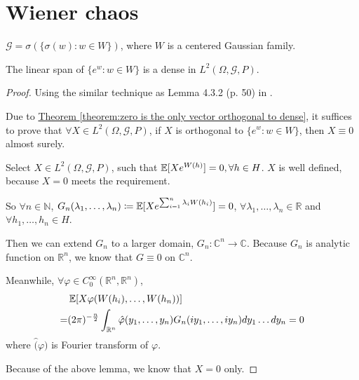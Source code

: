 \chapter{Wiener chaos}

\begin{definition}
$\mathcal{G} = \sigma(\{\sigma(w): w \in W \})$, where $W$ is a centered Gaussian family. 
\end{definition}

\begin{lemma}
\label{lemma:linear span is dense}
The linear span of $\{e^{w}: w \in W\}$ is a dense in $L^2(\Omega, \mathcal{G}, P)$. 
\end{lemma}

\begin{proof}

Using the similar technique as Lemma 4.3.2 (p. 50) in 
\parencite{S}. 

Due to \hyperref[theorem:zero is the only vector orthogonal to dense]
{Theorem \ref*{theorem:zero is the only vector orthogonal to dense}}, it suffices to prove that $\forall X \in L^2(\Omega, \mathcal{G}, P)$, if $X$ is orthogonal to $\{e^{w}: w \in W\}$, then $X \equiv 0$ almost surely. 

Select $X \in L^2(\Omega, \mathcal{G}, P)$, such that $\operatorname{\mathbb{E}}[Xe^{W(h)}]=0, \forall h \in H$. $X$ is well defined, because $X = 0$ meets the requirement. 

So $\forall n \in \mathbb{N}$, 
$G_n(\lambda_1, \dots, \lambda_n) \coloneqq 
\operatorname{\mathbb{E}}[X e^{\sum_{i=1}^{n} \lambda_i W(h_i) }] = 0$, 
$\forall \lambda_1, \dots, \lambda_n \in \mathbb{R}$ and 
$\forall h_1, \dots, h_n \in H$. 

Then we can extend $G_n$ to a larger domain, 
$G_n: \mathbb{C}^n \to \mathbb{C}$. Because $G_n$ is analytic function on $\mathbb{R}^n$, we know that $G \equiv 0$ on $\mathbb{C}^n$. 

Meanwhile, $\forall \varphi \in C_{0}^{\infty}(\mathbb{R}^n, \mathbb{R}^n)$, 
\begin{equation*}
\begin{aligned}
&\operatorname{\mathbb{E}}[X\varphi(W(h_i), \dots, W(h_n))] \\
= &(2\pi)^{-\frac{n}{2}} 
\int_{\mathbb{R}^n} \hat{\varphi}(y_1, \dots, y_n) G_n(iy_1, \dots, iy_n) dy_1\dots dy_n = 0
\end{aligned}
\end{equation*}
where $\hat(\varphi)$ is Fourier transform of $\varphi$. 

Because of the above lemma, we know that $X = 0$ only. 
\end{proof}

